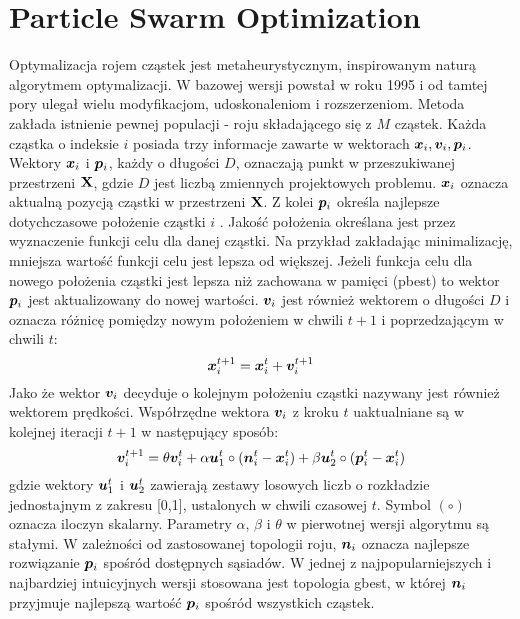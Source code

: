 \section{Particle Swarm Optimization} \label{sect:pso_def}
Optymalizacja rojem cząstek  jest metaheurystycznym, inspirowanym naturą algorytmem optymalizacji. W bazowej wersji powstał w roku 1995 \parencite{Kennedy1995a,Eberhart1995} i od tamtej pory ulegał wielu modyfikacjom, udoskonaleniom i rozszerzeniom. Metoda zakłada istnienie pewnej populacji - roju składającego się z $M$ cząstek. Każda cząstka o indeksie $i$ posiada trzy informacje zawarte w wektorach $\bm{x}_i,\bm{v}_i,\bm{p}_i$. Wektory $\bm{x}_i$ i $\bm{p}_i$, każdy o długości $D$, oznaczają punkt w przeszukiwanej przestrzeni $\mathbf{X}$, gdzie $D$ jest liczbą zmiennych projektowych problemu. $\bm{x}_i$ oznacza aktualną pozycją cząstki w przestrzeni $\mathbf{X}$. Z kolei $\bm{p}_i$ określa najlepsze dotychczasowe położenie cząstki $i$ . Jakość położenia określana jest przez wyznaczenie funkcji celu dla danej cząstki. Na przykład zakładając minimalizację, mniejsza wartość funkcji celu jest lepsza od większej. Jeżeli funkcja celu dla nowego położenia cząstki jest lepsza niż zachowana w pamięci (pbest) to wektor $\bm{p}_i$ jest aktualizowany do nowej wartości. $\bm{v}_i$ jest również wektorem o długości $D$ i oznacza różnicę pomiędzy nowym położeniem w chwili $t+1$ i poprzedzającym w chwili $t$:
\begin{equation} \label{eq: pso_position}
	\bm{x}_i^{t+1}=\bm{x}_i^t+\bm{v}_i^{t+1}
\end{equation}
 Jako że wektor $\bm{v}_i$ decyduje o kolejnym położeniu cząstki nazywany jest również wektorem prędkości. Współrzędne wektora $\bm{v}_i$ z kroku $t$ uaktualniane są w kolejnej iteracji $t+1$ w następujący sposób:
\begin{equation} \label{eq: pso_velocity}
	\bm{v}_{i}^{t+1}=\theta\bm{v}_i^t+\alpha\bm{u}_1^t\circ (\bm{n}_i^t-\bm{x}_i^t)+\beta\bm{u}_2^t\circ(\bm{p}_i^t-\bm{x}_i^t)
\end{equation}
gdzie wektory $\bm{u}_1^t$ i $\bm{u}_2^t$ zawierają zestawy losowych liczb o rozkładzie jednostajnym z zakresu [0,1], ustalonych w chwili czasowej $t$. Symbol $(\circ)$ oznacza iloczyn skalarny. Parametry $\alpha$, $\beta$ i $\theta$ w pierwotnej wersji algorytmu są stałymi. W zależności od zastosowanej topologii roju, $\bm{n}_i$ oznacza najlepsze rozwiązanie $\bm{p}_i$ spośród dostępnych sąsiadów. W jednej z najpopularniejszych i najbardziej intuicyjnych wersji stosowana jest topologia gbest, w której $\bm{n}_i$ przyjmuje najlepszą wartość $\bm{p}_i$ spośród wszystkich cząstek.
